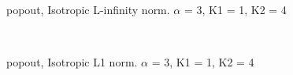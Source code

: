 
\begin{figure}
  \centering
     \\
  \caption{popout, Isotropic L-infinity norm. $\alpha$ = 3, K1 = 1, K2 = 4}
  \label{fig:popout_LINF_a4_k11_k24}
\end{figure}

\begin{figure}
  \centering
     \\
  \caption{popout, Isotropic L1 norm. $\alpha$ = 3, K1 = 1, K2 = 4}
  \label{fig:popout_L1_a4_k11_k24}
\end{figure}


